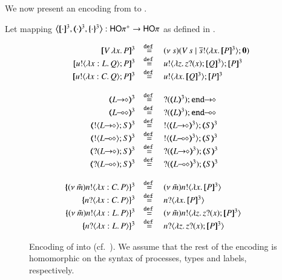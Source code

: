 We now present an encoding from \HOpp to \HOp.
%
\begin{definition}\rm
	\label{def:enc:HOpp_to_HOp}
	Let mapping $\enco{\pmap{\cdot}{3}, \tmap{\cdot}{3}, \mapa{\cdot}^{3}}: \HOpp \to \HOp$
	as defined in .
\end{definition}
%
\begin{figure}[t]
	\[
	\begin{array}{rcl}
		\pmap{\appl{V}{\abs{x} P}}{3} &\defeq& \newsp{s}{\appl{V}{s} \Par \bout{\dual{s}}{\abs{x} \pmap{P}{3}} \inact}
		\\
		\pmap{\bout{u}{\abs{x: L}{Q}} P}{3} &\defeq& \bout{u}{\abs{z}{\binp{z}{x} \pmap{Q}{3}}} \pmap{P}{3}
		\\
		\pmap{\bout{u}{\abs{x: C}{Q}} P}{3} &\defeq& \bout{u}{\abs{x}{\pmap{Q}{3}}} \pmap{P}{3}
		\\
		\\
		\tmap{\shot{L}}{3} &\defeq& \shot{\btinp{\tmap{L}{3}} \tinact}
		\\
		\tmap{\lhot{L}}{3} &\defeq& \lhot{\btinp{\tmap{L}{3}} \tinact}
		\\
		\tmap{\btout{\shot{L}} S}{3} &\defeq& \btout{\tmap{\shot{L}}{3}} \tmap{S}{3}
		\\
		\tmap{\btout{\lhot{L}} S}{3} &\defeq& \btout{\tmap{\lhot{L}}{3}} \tmap{S}{3}
		\\
		\tmap{\btinp{\shot{L}} S}{3} &\defeq& \btinp{\tmap{\shot{L}}{3}} \tmap{S}{3}
		\\
		\tmap{\btinp{\lhot{L}} S}{3} &\defeq& \btinp{\tmap{\lhot{L}}{3}} \tmap{S}{3}
		\\
		\\
		\mapa{\news{\tilde{m}} \bactout{n}{\abs{x:C}{P}}}^{3} &\defeq& \news{\tilde{m}} \bactout{n}{\abs{x}{\pmap{P}{3}}}
		\\
		\mapa{\bactinp{n}{\abs{x:C}{P}}}^{3} &\defeq& \bactinp{n}{\abs{x}{\pmap{P}{3}}}
		\\
		\mapa{\news{\tilde{m}} \bactout{n}{\abs{x:L}{P}}}^{3} &\defeq& \news{\tilde{m}} \bactout{n}{\abs{z}{\binp{z}{x} \pmap{P}{3}}}
		\\
		\mapa{\bactinp{n}{\abs{x:L}{P}}}^{3} &\defeq& \bactinp{n}{\abs{z}{\binp{z}{x} \pmap{P}{3}}}

	\end{array}
	\]
%
	\caption{Encoding of \HOpp into \HOp (cf.~).
	We assume that the rest of the encoding is homomorphic on the syntax of
	processes, types and labels, respectively. \label{fig:enc:HOpp_to_HOp}}
\end{figure}

